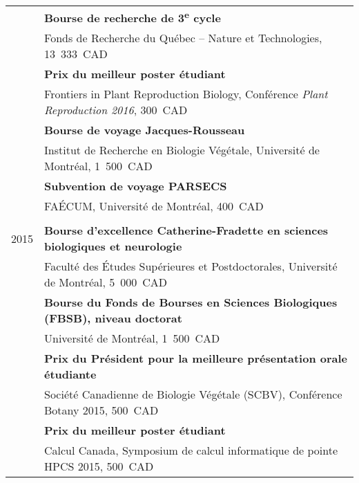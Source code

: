\documentclass[letterpaper,10pt]{article}
\begin{document}
{\begin{tabular}{r|p{14cm}}
& \textbf{Bourse de recherche de 3\textsuperscript{e} cycle} \\
& Fonds de Recherche du Québec -- Nature et Technologies, 13~333~CAD \vspace{1.3mm} \\

& \textbf{Prix du meilleur poster étudiant} \\
& Frontiers in Plant Reproduction Biology, Conférence \emph{Plant Reproduction 2016}, 300~CAD \vspace{1.3mm} \\

& \textbf{Bourse de voyage Jacques-Rousseau} \\
& Institut de Recherche en Biologie Végétale, Université de Montréal, 1~500~CAD \vspace{1.3mm} \\

& \textbf{Subvention de voyage PARSECS} \\
& FAÉCUM, Université de Montréal, 400~CAD \\

\multicolumn{2}{c}{} \\

2015

& \textbf{Bourse d'excellence Catherine-Fradette en sciences biologiques et neurologie} \\
& Faculté des Études Supérieures et Postdoctorales, Université de Montréal, 5~000~CAD \vspace{1.3mm} \\

& \textbf{Bourse du Fonds de Bourses en Sciences Biologiques (FBSB), niveau doctorat} \\
& Université de Montréal, 1~500~CAD  \vspace{1.3mm} \\

& \textbf{Prix du Président pour la meilleure présentation orale étudiante} \\
& Société Canadienne de Biologie Végétale (SCBV), Conférence Botany 2015, 500~CAD \vspace{1.3mm} \\

& \textbf{Prix du meilleur poster étudiant} \\
& Calcul Canada, Symposium de calcul informatique de pointe HPCS 2015, 500~CAD \vspace{1.3mm} \\


\end{tabular}}
\end{document}
